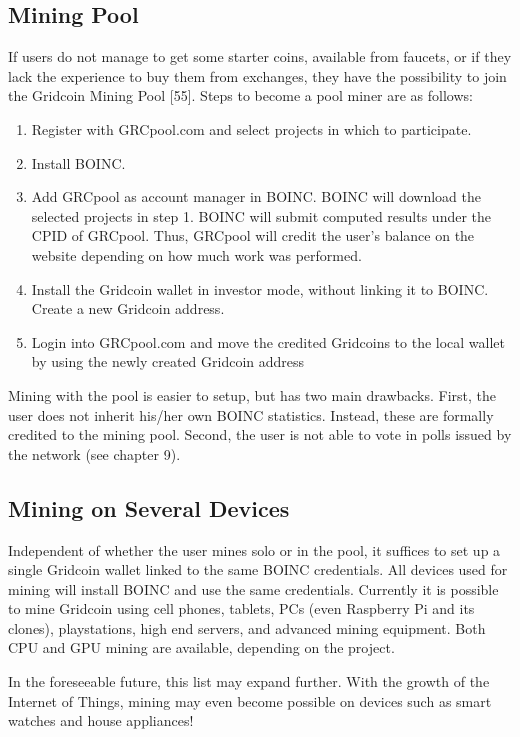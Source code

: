 \subsection{Mining Pool}

If users do not manage to get some starter coins, available from faucets, or if they lack the experience to buy them from exchanges, they have the possibility to join the Gridcoin Mining Pool [55]. Steps to become a pool miner are as follows:

\begin{enumerate}
  \item Register with GRCpool.com and select projects in which to participate.
  \item Install BOINC.
  \item Add GRCpool as account manager in BOINC. BOINC will download the selected projects in step 1. BOINC will submit computed results under the CPID of GRCpool. Thus, GRCpool will credit the user's balance on the website depending on how much work was performed. 
  \item Install the Gridcoin wallet in investor mode, without linking it to BOINC. Create a new Gridcoin address.
  \item Login into GRCpool.com and move the credited Gridcoins to the local wallet by using the newly created Gridcoin address
\end{enumerate}

Mining with the pool is easier to setup, but has two main drawbacks. First, the user does not inherit his/her own BOINC statistics. Instead, these are formally credited to the mining pool. Second, the user is not able to vote in polls issued by the network (see chapter 9).

\subsection{Mining on Several Devices}

Independent of whether the user mines solo or in the pool, it suffices to set up a single Gridcoin wallet linked to the same BOINC credentials. All devices used for mining will install BOINC and use the same credentials. Currently it is possible to mine Gridcoin using cell phones, tablets, PCs (even Raspberry Pi and its clones), playstations, high end servers, and advanced mining equipment. Both CPU and GPU mining are available, depending on the project.

In the foreseeable future, this list may expand further. With the growth of the Internet of Things, mining may even become possible on devices such as smart watches and house appliances! 

